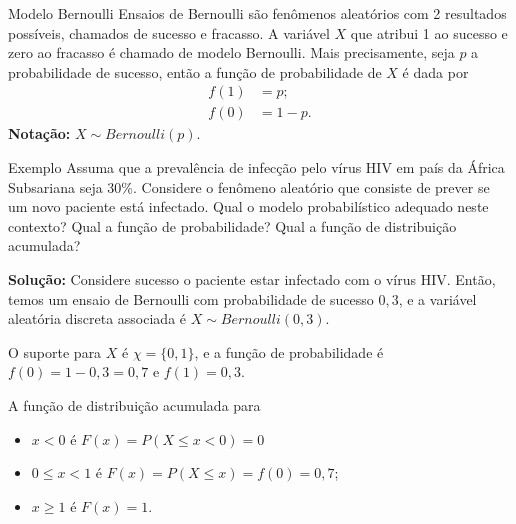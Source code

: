 \documentclass[9pt]{beamer}
\begin{document}
\begin{frame}{Modelo Bernoulli}
Ensaios de Bernoulli são fenômenos aleatórios com 2 resultados possíveis, chamados de sucesso e fracasso. A variável $X$ que atribui 1 ao sucesso e zero ao fracasso é chamado de modelo Bernoulli.
Mais precisamente, seja $p$ a probabilidade de sucesso, então a função de probabilidade de $X$ é dada por
\begin{align*}
f(1) &= p;\\
f(0) &= 1-p.
\end{align*}
\textbf{Notação:} $X \sim Bernoulli(p)$.
\end{frame}

\begin{frame}{Exemplo}
Assuma que a prevalência de infecção pelo vírus HIV em país da África Subsariana seja 30\%. Considere o fenômeno aleatório que consiste de prever se um novo paciente está infectado. Qual o modelo probabilístico adequado neste 
contexto? Qual a função de probabilidade? Qual a função de distribuição acumulada?
\vfill

\textbf{Solução:} Considere sucesso o paciente estar infectado com o vírus HIV. Então, temos um ensaio de Bernoulli com probabilidade de sucesso
$0,3$, e a variável aleatória discreta associada é $X \sim Bernoulli(0,3)$. 

O suporte para $X$ é $\chi=\{0,1\}$, e a função de probabilidade é $f(0)=1-0,3=0,7$ e $f(1)=0,3$. 

A função de distribuição acumulada para
\begin{itemize}
 \item $x < 0$ é $F(x) = P(X \leq x < 0) = 0$
 \item $0 \leq x < 1$ é $F(x) = P(X \leq x) = f(0) = 0,7$;
 \item $x \geq 1$ é $F(x) =1$.
\end{itemize}

\begin{figure}
 \centering
\end{figure}


\end{frame}
\end{document}
